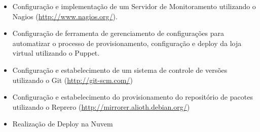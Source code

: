 \begin{itemize}

\item Configuração e implementação de um Servidor de Monitoramento utilizando o Nagios (\url{http://www.nagios.org/}). 

\item Configuração de ferramenta de gerenciamento de configurações para automatizar o processo de provisionamento, configuração e deploy da loja virtual utilizando o Puppet.

\item Configuração e estabelecimento de um sistema de controle de versões utilizando o Git (\url{http://git-scm.com/})

\item Configuração e estabelecimento do provisionamento do repositório de pacotes utilizando o Reprero (\url{http://mirrorer.alioth.debian.org/})

\item Realização de Deploy na Nuvem

\end{itemize}


